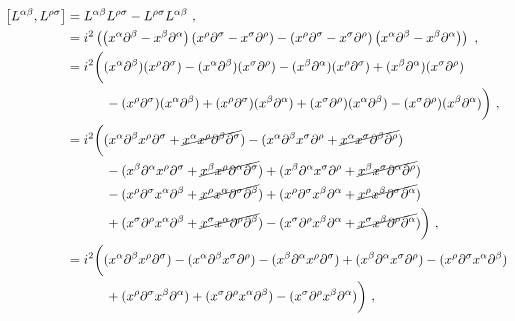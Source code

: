 \documentclass[12pt,a4paper]{report}
\begin{document}
\begin{align}
    \left[L^{{\alpha}{\beta}},L^{{\rho}{\sigma}}\right]&=L^{{\alpha}{\beta}}L^{{\rho}{\sigma}}-L^{{\rho}{\sigma}}L^{{\alpha}{\beta}}\nonumber~,\\
    &=i^2\left(\left(x^{{\alpha}}\partial^{{\beta}}-x^{{\beta}}\partial^{{\alpha}}\right)\left(x^{{\rho}}\partial^{{\sigma}}-x^{{\sigma}}\partial^{{\rho}}\right)-\left(x^{{\rho}}\partial^{{\sigma}}-x^{{\sigma}}\partial^{{\rho}}\right)\left(x^{{\alpha}}\partial^{{\beta}}-x^{{\beta}}\partial^{{\alpha}}\right)\right)\nonumber~,\\
    &=i^2\bigg((x^{{\alpha}}\partial^{{\beta}})(x^{{\rho}}\partial^{{\sigma}})-(x^{{\alpha}}\partial^{{\beta}})(x^{{\sigma}}\partial^{{\rho}})-(x^{{\beta}}\partial^{{\alpha}})(x^{{\rho}}\partial^{{\sigma}})+(x^{{\beta}}\partial^{{\alpha}})(x^{{\sigma}}\partial^{{\rho}})\nonumber\\
    &~~~~~~~~~-(x^{{\rho}}\partial^{{\sigma}})(x^{{\alpha}}\partial^{{\beta}})+(x^{{\rho}}\partial^{{\sigma}})(x^{{\beta}}\partial^{{\alpha}})+(x^{{\sigma}}\partial^{{\rho}})(x^{{\alpha}}\partial^{{\beta}})-(x^{{\sigma}}\partial^{{\rho}})(x^{{\beta}}\partial^{{\alpha}})\bigg)\nonumber~,\\
    &=i^2\bigg((x^{{\alpha}}\partial^{{\beta}}x^{{\rho}}\partial^{{\sigma}}+\cancel{x^{{\alpha}}x^{{\rho}}\partial^{{\beta}}\partial^{{\sigma}}})-(x^{{\alpha}}\partial^{{\beta}}x^{{\sigma}}\partial^{{\rho}}+\cancel{x^{{\alpha}}x^{{\sigma}}\partial^{{\beta}}\partial^{{\rho}}})\nonumber\\
    &~~~~~~~~~-(x^{{\beta}}\partial^{{\alpha}}x^{{\rho}}\partial^{{\sigma}}+\cancel{x^{{\beta}}x^{{\rho}}\partial^{{\alpha}}\partial^{{\sigma}}})+(x^{{\beta}}\partial^{{\alpha}}x^{{\sigma}}\partial^{{\rho}}+\cancel{x^{{\beta}}x^{{\sigma}}\partial^{{\alpha}}\partial^{{\rho}}})\nonumber\\
    &~~~~~~~~~-(x^{{\rho}}\partial^{{\sigma}}x^{{\alpha}}\partial^{{\beta}}+\cancel{x^{{\rho}}x^{{\alpha}}\partial^{{\sigma}}\partial^{{\beta}}})+(x^{{\rho}}\partial^{{\sigma}}x^{{\beta}}\partial^{{\alpha}}+\cancel{x^{{\rho}}x^{{\beta}}\partial^{{\sigma}}\partial^{{\alpha}}})\nonumber\\
    &~~~~~~~~~+(x^{{\sigma}}\partial^{{\rho}}x^{{\alpha}}\partial^{{\beta}}+\cancel{x^{{\sigma}}x^{{\alpha}}\partial^{{\rho}}\partial^{{\beta}}})-(x^{{\sigma}}\partial^{{\rho}}x^{{\beta}}\partial^{{\alpha}}+\cancel{x^{{\sigma}}x^{{\beta}}\partial^{{\rho}}\partial^{{\alpha}}})\bigg)\nonumber~,\\
    &=i^2\bigg((x^{{\alpha}}\partial^{{\beta}}x^{{\rho}}\partial^{{\sigma}})-(x^{{\alpha}}\partial^{{\beta}}x^{{\sigma}}\partial^{{\rho}})-(x^{{\beta}}\partial^{{\alpha}}x^{{\rho}}\partial^{{\sigma}})+(x^{{\beta}}\partial^{{\alpha}}x^{{\sigma}}\partial^{{\rho}})-(x^{{\rho}}\partial^{{\sigma}}x^{{\alpha}}\partial^{{\beta}})\nonumber\\
    &~~~~~~~~~+(x^{{\rho}}\partial^{{\sigma}}x^{{\beta}}\partial^{{\alpha}})+(x^{{\sigma}}\partial^{{\rho}}x^{{\alpha}}\partial^{{\beta}})-(x^{{\sigma}}\partial^{{\rho}}x^{{\beta}}\partial^{{\alpha}})\bigg)~,
    \end{align}
    
\end{document}
